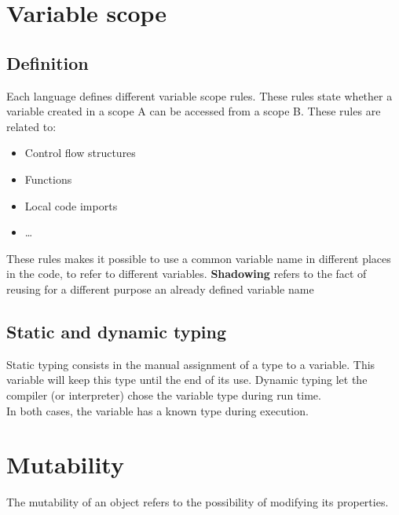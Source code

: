 \documentclass[11pt]{article}
\begin{document}
		\section{Variable scope}

			\subsection{Definition}
				Each language defines different variable scope rules. These rules state whether a variable created in a scope A can be accessed from a scope B. 
                These rules are related to:
				\begin{itemize}
					\item Control flow structures
					\item Functions
					\item Local code imports
					\item \ldots
				\end{itemize}
				These rules makes it possible to use a common variable name in different places in the code, to refer to different variables.
                \textbf{Shadowing} refers to the fact of reusing for a different purpose an already defined variable name

			\subsection{Static and dynamic typing}
				Static typing consists in the manual assignment of a type to a variable. This variable will keep this type until the end of its use.
				Dynamic typing let the compiler (or interpreter) chose the variable type during run time. \\
				In both cases, the variable has a known type during execution.

		\section{Mutability}
        		The mutability of an object refers to the possibility of modifying its properties.
\end{document}
